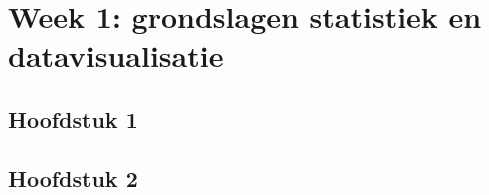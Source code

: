 \chapter*{Week 1: grondslagen statistiek en datavisualisatie}

\section*{Hoofdstuk 1}














\section*{Hoofdstuk 2}









